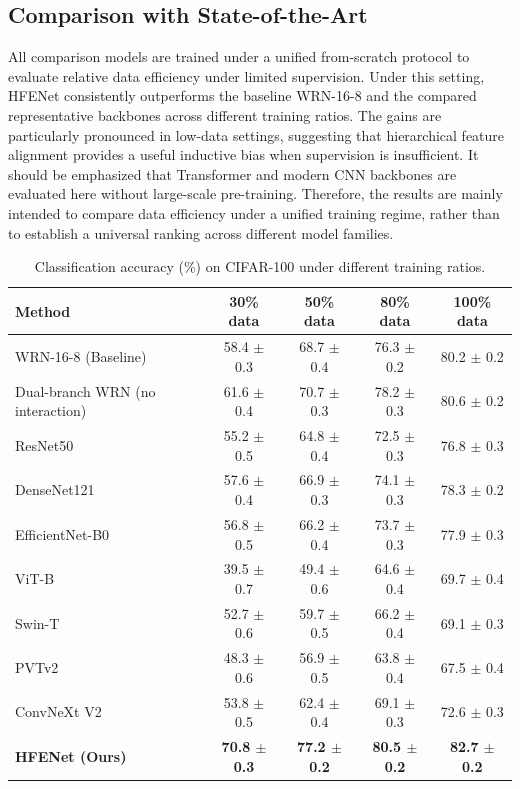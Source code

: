 \documentclass[pdflatex,sn-mathphys-num]{sn-jnl}
\theoremstyle{thmstyleone}%
\theoremstyle{thmstyletwo}%
\theoremstyle{thmstylethree}%
\begin{document}
\subsection{Comparison with State-of-the-Art}
All comparison models are trained under a unified from-scratch protocol to evaluate relative data efficiency under limited supervision. 
Under this setting, HFENet consistently outperforms the baseline WRN-16-8 and the compared representative backbones across different training ratios. 
The gains are particularly pronounced in low-data settings, suggesting that hierarchical feature alignment provides a useful inductive bias when supervision is insufficient. 
It should be emphasized that Transformer and modern CNN backbones are evaluated here without large-scale pre-training. 
Therefore, the results are mainly intended to compare data efficiency under a unified training regime, rather than to establish a universal ranking across different model families.

\begin{table}[htbp]
    \centering
    \caption{Classification accuracy (\%) on CIFAR-100 under different training ratios.}
    \label{tab:cifar100_data_ratio}
    \begin{tabular}{@{}lcccc@{}}
    \toprule
    \textbf{Method} & \textbf{30\% data} & \textbf{50\% data} & \textbf{80\% data} & \textbf{100\% data} \\
    \midrule
    WRN-16-8 (Baseline) & 58.4 $\pm$ 0.3 & 68.7 $\pm$ 0.4 & 76.3 $\pm$ 0.2 & 80.2 $\pm$ 0.2 \\
    Dual-branch WRN (no interaction) & 61.6 $\pm$ 0.4 & 70.7 $\pm$ 0.3 & 78.2 $\pm$ 0.3 & 80.6 $\pm$ 0.2 \\
    ResNet50 & 55.2 $\pm$ 0.5 & 64.8 $\pm$ 0.4 & 72.5 $\pm$ 0.3 & 76.8 $\pm$ 0.3 \\
    DenseNet121 & 57.6 $\pm$ 0.4 & 66.9 $\pm$ 0.3 & 74.1 $\pm$ 0.3 & 78.3 $\pm$ 0.2 \\
    EfficientNet-B0 & 56.8 $\pm$ 0.5 & 66.2 $\pm$ 0.4 & 73.7 $\pm$ 0.3 & 77.9 $\pm$ 0.3 \\
    ViT-B & 39.5 $\pm$ 0.7 & 49.4 $\pm$ 0.6 & 64.6 $\pm$ 0.4 & 69.7 $\pm$ 0.4 \\
    Swin-T & 52.7 $\pm$ 0.6 & 59.7 $\pm$ 0.5 & 66.2 $\pm$ 0.4 & 69.1 $\pm$ 0.3 \\
    PVTv2 & 48.3 $\pm$ 0.6 & 56.9 $\pm$ 0.5 & 63.8 $\pm$ 0.4 & 67.5 $\pm$ 0.4 \\
    ConvNeXt V2 & 53.8 $\pm$ 0.5 & 62.4 $\pm$ 0.4 & 69.1 $\pm$ 0.3 & 72.6 $\pm$ 0.3 \\
    \midrule
    \textbf{HFENet (Ours)} & \textbf{70.8 $\pm$ 0.3} & \textbf{77.2 $\pm$ 0.2} & \textbf{80.5 $\pm$ 0.2} & \textbf{82.7 $\pm$ 0.2} \\
    \bottomrule
    \end{tabular}
\end{table}
\end{document}
